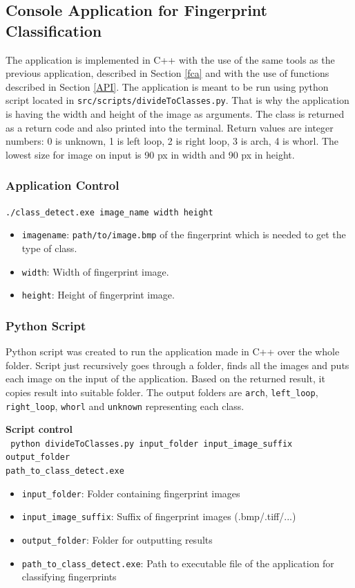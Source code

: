\subsection{Console Application for Fingerprint Classification}
\label{clasifyApp}
The application is implemented in C++ with the use of the same tools as the previous application, described in Section \ref{fca} and with the use of functions described in Section \ref{API}. The application is meant to be run using python script located in \texttt{src/scripts/divideToC\-lasses.py}. That is why the application is having the width and height of the image as arguments. The class is returned as a return code and also printed into the terminal. Return values are integer numbers: 0 is unknown, 1 is left loop, 2 is right loop, 3 is arch, 4 is whorl. The lowest size for image on input is 90 px in width and 90 px in height.

\subsubsection{Application Control}
\texttt{./class\_detect.exe image\_name width height}
\begin{itemize}
    \item \texttt{imagename}: \texttt{path/to/image.bmp} of the fingerprint which is needed to get the type of class.
    \item \texttt{width}: Width of fingerprint image.
    \item \texttt{height}: Height of fingerprint image.
\end{itemize}

\subsubsection{Python Script}
\label{classscript}
Python script was created to run the application made in C++ over the whole folder. Script just recursively goes through a folder, finds all the images and puts each image on the input of the application. Based on the returned result, it copies result into suitable folder. The output folders are \texttt{arch}, \texttt{left\_loop}, \texttt{right\_loop}, \texttt{whorl} and \texttt{unknown} representing each class. 

\textbf{Script control}\\
\texttt{ python divideToClasses.py input\_folder input\_image\_suffix output\_folder \\ path\_to\_class\_detect.exe}
\begin{itemize}
	\item \texttt{input\_folder}: Folder containing fingerprint images
	\item \texttt{input\_image\_suffix}: Suffix of fingerprint images (.bmp/.tiff/...)
	\item \texttt{output\_folder}: Folder for outputting results
	\item \texttt{path\_to\_class\_detect.exe}: Path to executable file of the application for classifying fingerprints
\end{itemize}

